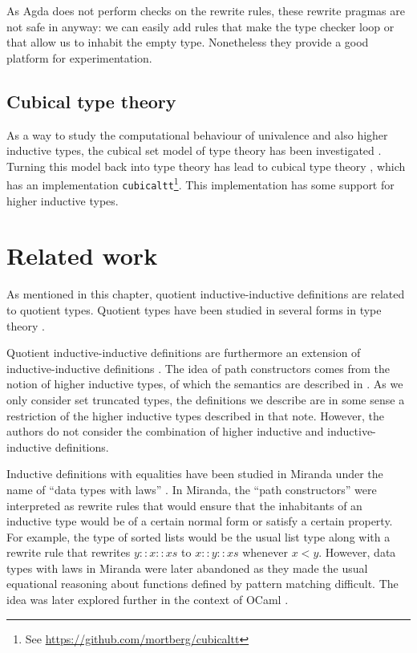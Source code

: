 As Agda does not perform checks on the rewrite rules, these rewrite
pragmas are not safe in anyway: we can easily add rules that make the
type checker loop or that allow us to inhabit the empty
type. Nonetheless they provide a good platform for experimentation.

\subsection{Cubical type theory}

As a way to study the computational behaviour of univalence and also
higher inductive types, the cubical set model of type theory has been
investigated \cite{Bezem2014}. Turning this model back into type
theory has lead to cubical type theory \cite{Cohen2015}, which has an
implementation \verb+cubicaltt+\footnote{See
  \url{https://github.com/mortberg/cubicaltt}}. This implementation
has some support for higher inductive types.

\section{Related work}

As mentioned in this chapter, quotient inductive-inductive definitions
are related to quotient types. Quotient types have been studied in
several forms in type theory
\cite{Hofmann1995,Altenkirch2011ii,Nuo2015}.

Quotient inductive-inductive definitions are furthermore an extension
of inductive-inductive definitions \cite{Altenkirch2011}. The idea of
path constructors comes from the notion of higher inductive types, of
which the semantics are described in \cite{Lumsdaine2013}. As we only
consider set truncated types, the definitions we describe are in some
sense a restriction of the higher inductive types described in that
note. However, the authors do not consider the combination of higher
inductive and inductive-inductive definitions.

Inductive definitions with equalities have been studied in Miranda
\cite{Turner1985} under the name of ``data types with laws''
\cite{Thompson1986} \cite{Thompson1990}. In Miranda, the ``path
constructors'' were interpreted as rewrite rules that would ensure
that the inhabitants of an inductive type would be of a certain normal
form or satisfy a certain property. For example, the type of sorted
lists would be the usual list type along with a rewrite rule that
rewrites $y :: x :: xs$ to $x :: y :: xs$ whenever $x < y$. However, data
types with laws in Miranda were later abandoned as they made the usual
equational reasoning about functions defined by pattern matching
difficult. The idea was later explored further in the context of OCaml
\cite{Blanqui2007}.

